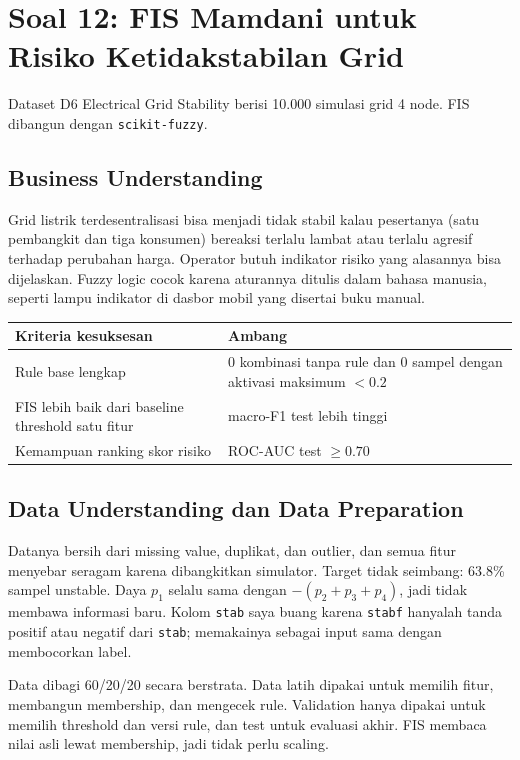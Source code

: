 \newpage
\section{Soal 12: FIS Mamdani untuk Risiko Ketidakstabilan Grid}

Dataset D6 Electrical Grid Stability berisi 10.000 simulasi grid 4 node. FIS dibangun dengan \texttt{scikit-fuzzy}.

\subsection{Business Understanding}
Grid listrik terdesentralisasi bisa menjadi tidak stabil kalau pesertanya (satu pembangkit dan tiga konsumen) bereaksi terlalu lambat atau terlalu agresif terhadap perubahan harga. Operator butuh indikator risiko yang alasannya bisa dijelaskan. Fuzzy logic cocok karena aturannya ditulis dalam bahasa manusia, seperti lampu indikator di dasbor mobil yang disertai buku manual.

\begin{tabularx}{\textwidth}{@{}LL@{}}
\toprule
\textbf{Kriteria kesuksesan} & \textbf{Ambang} \\
\midrule
Rule base lengkap & 0 kombinasi tanpa rule dan 0 sampel dengan aktivasi maksimum $< 0.2$ \\
FIS lebih baik dari baseline threshold satu fitur & macro-F1 test lebih tinggi \\
Kemampuan ranking skor risiko & ROC-AUC test $\geq 0.70$ \\
\bottomrule
\end{tabularx}

\subsection{Data Understanding dan Data Preparation}
Datanya bersih dari missing value, duplikat, dan outlier, dan semua fitur menyebar seragam karena dibangkitkan simulator. Target tidak seimbang: 63.8\% sampel unstable. Daya $p_1$ selalu sama dengan $-(p_2 + p_3 + p_4)$, jadi tidak membawa informasi baru. Kolom \texttt{stab} saya buang karena \texttt{stabf} hanyalah tanda positif atau negatif dari \texttt{stab}; memakainya sebagai input sama dengan membocorkan label.

Data dibagi 60/20/20 secara berstrata. Data latih dipakai untuk memilih fitur, membangun membership, dan mengecek rule. Validation hanya dipakai untuk memilih threshold dan versi rule, dan test untuk evaluasi akhir. FIS membaca nilai asli lewat membership, jadi tidak perlu scaling.

